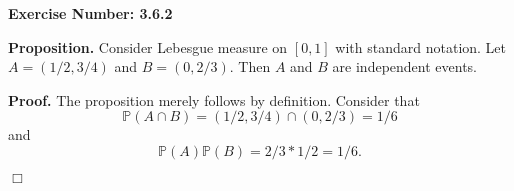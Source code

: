 \documentclass{article}
\begin{document}
\noindent \textbf{Exercise Number: 3.6.2}  %

\bigskip

\noindent \textbf{Proposition.} Consider Lebesgue measure on $[0,1]$ with standard notation. Let $A = (1/2, 3/4)$ and $B = (0,2/3)$. Then $A$ and $B$ are independent events. 

\medskip

\noindent \textbf{Proof.} The proposition merely follows by definition. Consider that \[\mathbb{P}(A \cap B) = (1/2, 3/4) \cap (0, 2/3) = 1/6 \] and \[\mathbb{P}(A) \mathbb{P}(B) = 2/3 * 1/2 = 1/6.\]

\hfill $\Box$
\end{document}
